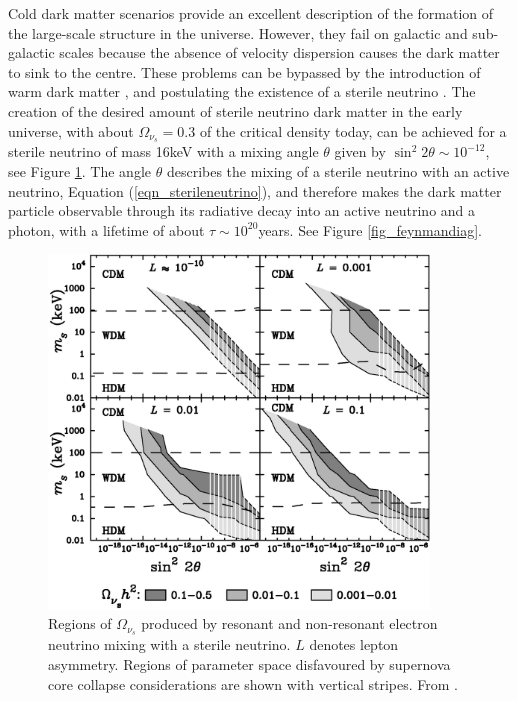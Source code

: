 Cold dark matter scenarios provide an excellent description of the formation of the large-scale structure in the universe. However, they fail
on galactic and sub-galactic scales \cite{ref_halofailcdm} because the absence of velocity dispersion causes the dark matter to sink
to the centre.
These problems can be bypassed by the introduction of warm dark matter \cite{ref_halofailwdmgalacticform},
and postulating the existence of a sterile neutrino \cite{ref_sterileneutrino}. The creation of the desired amount of sterile neutrino
dark matter in the early universe, with
about $\Omega_{\nu_s}=0.3$ of the critical density today, can be achieved for a sterile neutrino of mass 16keV with a mixing angle $\theta$
given by $\sin^2 2\theta \sim 10^{-12}$, see Figure \ref{fig_sterileelectronphase}.
The angle $\theta$ describes the mixing of a sterile neutrino with an active neutrino, Equation (\ref{eqn_sterileneutrino}), and therefore
makes the dark matter particle observable through its radiative decay into an active neutrino and a photon, with a lifetime of about
$\tau \sim 10^{20}$years. See Figure \ref{fig_feynmandiag}.
\begin{figure}[pt]
	\begin{center}
	\includegraphics[width=0.9\textwidth]{eps/omegaepanel.eps}
	\caption{Regions of $\Omega_{\nu_s}$ produced by resonant and non-resonant electron neutrino mixing with a sterile neutrino.
	$L$ denotes lepton asymmetry. Regions of parameter space disfavoured by supernova core collapse considerations are shown
	with vertical stripes. From \cite{ref_sterileneutrino}.}
	\label{fig_sterileelectronphase}
	\end{center}
\end{figure}
